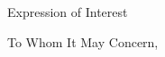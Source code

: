 \documentclass[10pt, letterpaper, font=sourcesanspro]{simple-cl}
\begin{document}
\makeclheader
\makeclfooter

\makeclrecipient

{\large\mdseries Expression of Interest}\\[0.5em]
\begin{clbody}
	To Whom It May Concern,\newline
	
	\lipsum[1]
\end{clbody}

\begin{clbody}
	\lipsum[1]
\end{clbody}

\makeclsignature
\end{document}
